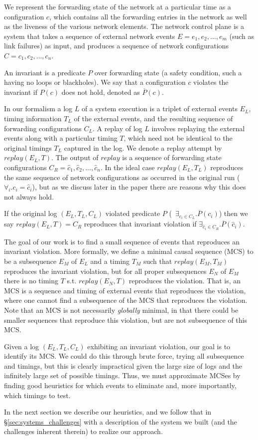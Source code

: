 We represent the forwarding state of the network
at a particular time as a configuration $c$, which contains all the forwarding
entries in the network
as well as the liveness of the various network elements.
The network control plane is a system that takes a sequence of
external network events $E = e_1,e_2,\dots,e_m$ (such as link failures) as input,
and produces a sequence of network configurations
$C = c_1,c_2,\dots,c_n$.

An invariant is a predicate $P$ over forwarding state (a safety
condition, such a having no loops or blackholes). We say that a configuration
$c$ violates the invariant if $P(c)$ does not
hold, denoted as $\overline{P}(c)$.

In our formalism a log $L$ of a system execution is a triplet of external events $E_L$,
timing information $T_L$ of the external events, and the resulting sequence of forwarding
configurations $C_L$.
A replay of log $L$ involves replaying the external events along with a
particular timing $T$,
which need not be identical to the original timings $T_L$ captured in the log.
We denote a replay attempt by $replay(E_L,T)$.
The output of $replay$ is a sequence of forwarding state configurations
$C_R = \hat{c}_1,\hat{c}_2,\dots,\hat{c}_n$. In the ideal case $replay(E_L,T_L)$ reproduces the same
sequence of network configurations as occurred in the original run
(\ie~$\forall_i. c_i = \hat{c}_i$), but as we discuss later in the paper there are reasons why
this does not always hold.

If the original log $(E_L, T_L, C_L)$ violated predicate $P$
(\ie~$\exists_{c_i \in C_L}. \overline{P}(c_i)$)
then we say $replay(E_L,T) = C_R$ reproduces that invariant violation if
$\exists_{\hat{c}_i \in C_R}. \overline{P}(\hat{c}_i)$.

The goal of our work is to find a small sequence of events that reproduces an
invariant violation.  More formally, we define a minimal causal sequence (MCS)
to be a subsequence $E_M$
of $E_L$ and a timing $T_M$ such
that $replay(E_M,T_M)$ reproduces the invariant violation, but for all proper
subsequences $E_N$ of $E_M$
there is no timing $T$ s.t. $replay(E_N,T)$ reproduces the violation.
That is, an MCS is a sequence and timing of external events that reproduces the violation,
where one cannot find a subsequence of the MCS that reproduces the violation.
Note that an MCS is not necessarily {\em globally} minimal, in that there could be smaller
sequences that reproduce this violation, but are not subsequence of this MCS.

Given a log $(E_L, T_L, C_L)$ exhibiting an invariant violation,
our goal is to identify its MCS. We could do this through brute force, trying
all subsequence and timings, but this is clearly impractical given the large size of logs and the
infinitely large set of possible timings. Thus, we must approximate MCSes by finding good heuristics
for which events to eliminate and, more importantly, which timings to test.

In the next section we describe our heuristics, and we follow that in \S\ref{sec:systems_challenges} with
a description of the system we built (and the challenges inherent therein) to realize our approach.
